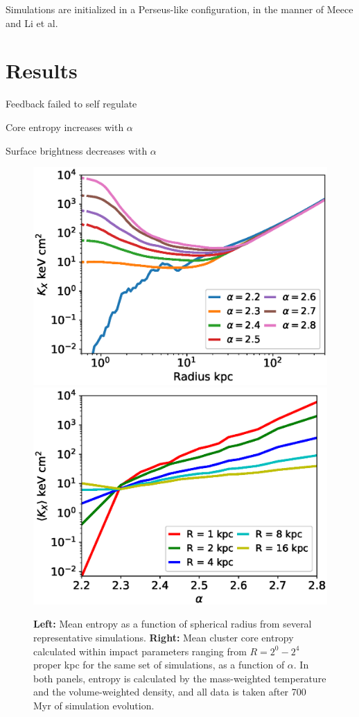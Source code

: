 \documentclass[iop,apjl, twocolappendix]{emulateapj}   %
\begin{document}
Simulations are initialized in a Perseus-like configuration, in the manner
of Meece \cite{meece_triggering_2017} and Li et al.\ \cite{li_cooling_2015} 

\section{Results}

\textbullet Feedback failed to self regulate

\textbullet Core entropy increases with $\alpha$

\textbullet Surface brightness decreases with $\alpha$


\label{sec:results}
\begin{figure}
	\begin{center}
		\includegraphics[width=0.49\linewidth]{figures/entropyVradius.eps}
		\includegraphics[width=0.49\linewidth]{figures/entropyValpha.eps}
	\end{center}
	\caption{
		\textbf{Left:}  Mean entropy as a function of spherical radius from
	several representative simulations.  \textbf{Right:} Mean cluster core
	entropy calculated within impact parameters ranging from $R = 2^0 - 2^4$ proper
	kpc for the same set of simulations, as a function of $\alpha$.  In both
	panels, entropy is calculated by the mass-weighted temperature and the
	volume-weighted density, and all data is taken after 700 Myr of simulation
	evolution.}
\end{figure}
\end{document}
